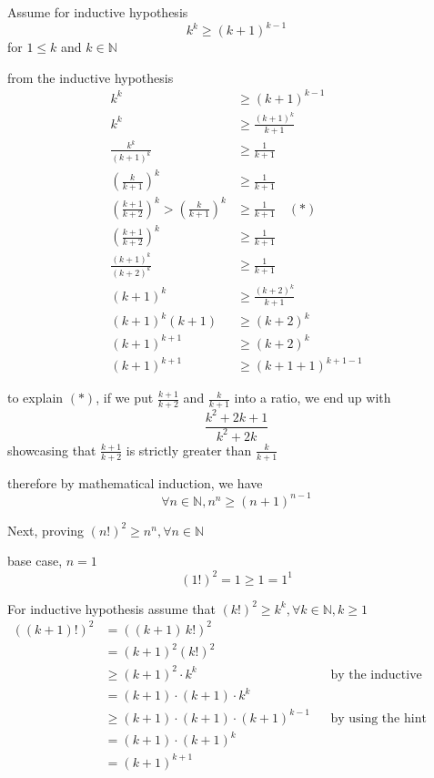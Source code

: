 \documentclass[letterpaper,11pt]{article}
\theoremstyle{plain}
\theoremstyle{definition}
\begin{document}
{\begin{enumerate}[a)]
    \noindent Assume for inductive hypothesis
    \[
    k^k \ge (k+1)^{k-1}
    \]
    for $1 \le k$ and $k \in \mathbb{N}$
     
    \noindent from the inductive hypothesis
    \begin{align*}
    k^k &\ge (k+1)^{k-1} \\
    k^k &\ge \frac{(k+1)^k}{k+1} \\
    \frac{k^k}{(k+1)^k} &\ge \frac{1}{k+1} \\
    \left(\frac{k}{k+1}\right)^k &\ge \frac{1}{k+1} \\
    \left(\frac{k+1}{k+2}\right)^k > \left(\frac{k}{k+1}\right)^k &\ge \frac{1}{k+1} \quad (*) \\
    \left(\frac{k+1}{k+2}\right)^k &\ge \frac{1}{k+1} \\
    \frac{(k+1)^k}{(k+2)^k} &\ge \frac{1}{k+1} \\
    (k+1)^k &\ge \frac{(k+2)^k}{k+1} \\
    (k+1)^k (k+1) &\ge (k+2)^k \\
    (k+1)^{k+1} &\ge (k+2)^k \\
    (k+1)^{k+1} &\ge (k+1+1)^{k+1-1}
    \end{align*}
     
    \noindent to explain $(*)$, if we put $\frac{k+1}{k+2}$ and $\frac{k}{k+1}$ into a ratio, we end up with
    \[
    \frac{k^2 + 2k + 1}{k^2 + 2k}
    \]
    showcasing that $\frac{k+1}{k+2}$ is strictly greater than $\frac{k}{k+1}$
     
    \noindent therefore by mathematical induction, we have
    \[
    \forall n \in \mathbb{N}, n^n \ge (n+1)^{n-1}
    \]
     
    \noindent Next, proving $(n!)^2 \ge n^n, \forall n \in \mathbb{N}$
     
    \noindent base case, $n = 1$
    \[
    (1!)^2 = 1 \ge 1 = 1^1
    \]
     
    \noindent For inductive hypothesis assume that $(k!)^2 \ge k^k, \forall k \in \mathbb{N}, k \ge 1$
    \begin{align*}
    ((k+1)!)^2 &= ((k+1)\, k!)^2 \\
    &= (k+1)^2 (k!)^2 \\
    &\ge (k+1)^2 \cdot k^k && \text{by the inductive hypothesis} \\
    &= (k+1) \cdot (k+1) \cdot k^k \\
    &\ge (k+1) \cdot (k+1) \cdot (k+1)^{k-1} && \text{by using the hint} \\
    &= (k+1) \cdot (k+1)^k \\
    &= (k+1)^{k+1}
    \end{align*}
     

\end{enumerate}}
\end{document}
